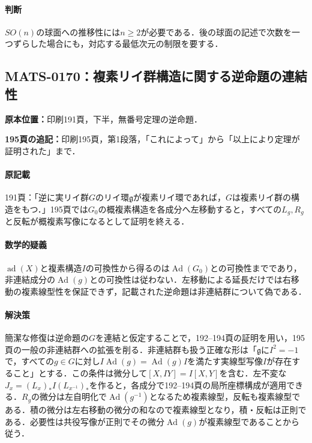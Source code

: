 \documentclass[a4paper,10pt]{ltjsarticle}
\begin{document}
\paragraph{判断}$SO(n)$の球面への推移性には$n\ge2$が必要である．後の球面の記述で次数を一つずらした場合にも，対応する最低次元の制限を要する．


\subsection*{MATS-0170：複素リイ群構造に関する逆命題の連結性}\label{math:MATS-0170}
\noindent\textbf{原本位置：}印刷191頁，下半，無番号定理の逆命題．

\textbf{195頁の追記：}印刷195頁，第1段落，「これによって」から「以上により定理が証明された」まで．

\paragraph{原記載}191頁：「逆に実リイ群$G$のリイ環$\mathfrak g$が複素リイ環であれば，$G$は複素リイ群の構造をもつ．」195頁では$G_0$の概複素構造を各成分へ左移動すると，すべての$L_g,R_g$と反転が概複素写像になるとして証明を終える．

\paragraph{数学的疑義}$\operatorname{ad}(X)$と複素構造$I$の可換性から得るのは$\operatorname{Ad}(G_0)$との可換性までであり，非連結成分の$\operatorname{Ad}(g)$との可換性は従わない．左移動による延長だけでは右移動の複素線型性を保証できず，記載された逆命題は非連結群について偽である．

\paragraph{解決策}簡潔な修復は逆命題の$G$を連結と仮定することで，192--194頁の証明を用い，195頁の一般の非連結群への拡張を削る．非連結群も扱う正確な形は「$\mathfrak g$に$I^2=-1$で，すべての$g\in G$に対し$I\operatorname{Ad}(g)=\operatorname{Ad}(g)I$を満たす実線型写像$I$が存在すること」とする．この条件は微分して$[X,IY]=I[X,Y]$を含む．左不変な$J_x=(L_x)_*I(L_{x^{-1}})_*$を作ると，各成分で192--194頁の局所座標構成が適用できる．$R_g$の微分は左自明化で$\operatorname{Ad}(g^{-1})$となるため複素線型，反転も複素線型である．積の微分は左右移動の微分の和なので複素線型となり，積・反転は正則である．必要性は共役写像が正則でその微分$\operatorname{Ad}(g)$が複素線型であることから従う．
\end{document}
